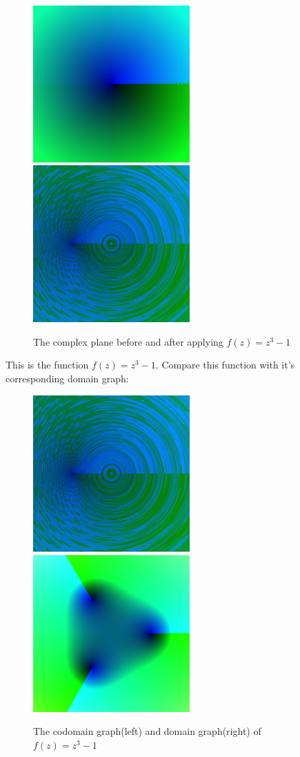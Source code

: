 \documentclass[letterpaper,12pt]{article}
\begin{document}
\begin{figure}[h]
	\includegraphics[width=6cm]{f(z)=z}
	\includegraphics[width=6cm]{f(z)=z^3-1}
	\centering
	\caption[\small]{The complex plane before and after applying $f(z) = z^3 - 1$}
	\centering
\end{figure}

This is the function $f(z) = z^3 - 1$. Compare this function with it's corresponding domain graph:

\begin{figure}[h]
	\includegraphics[width=6cm]{f(z)=z^3-1}
	\includegraphics[width=6cm]{f(z)=z^3-1_D}
	\centering
	\caption[basicstyle=\small]{The codomain graph(left) and domain graph(right) of $f(z) = z^3 - 1$}
\end{figure}
\end{document}
